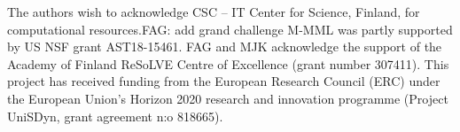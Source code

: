 \documentclass[preprint2]{aastex63}
\newcommand{\fag}[1]{\textcolor{midgreen}{FAG: #1}}
\begin{document}





\acknowledgments
The authors wish to acknowledge CSC – IT Center for Science, Finland, for computational
resources.\fag{add grand challenge}
 M-MML was partly supported by US NSF grant AST18-15461.
 FAG and MJK acknowledge the support of the Academy of Finland
ReSoLVE Centre of Excellence (grant number 307411).
This project has received funding from the European Research Council (ERC)
under the European Union's Horizon 2020 research and innovation
programme (Project UniSDyn, grant agreement n:o 818665).

{}

\end{document}
